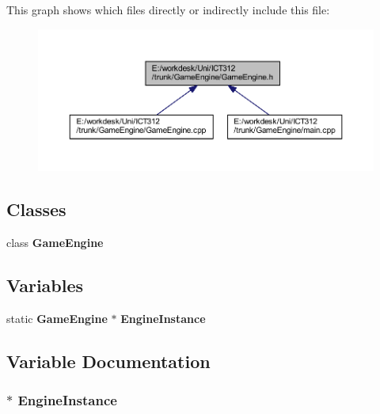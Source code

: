 This graph shows which files directly or indirectly include this file\+:\nopagebreak
\begin{figure}[H]
\begin{center}
\leavevmode
\includegraphics[width=350pt]{d8/dad/_game_engine_8h__dep__incl}
\end{center}
\end{figure}
\subsection*{Classes}
\begin{DoxyCompactItemize}
\item 
class {\bf Game\+Engine}
\end{DoxyCompactItemize}
\subsection*{Variables}
\begin{DoxyCompactItemize}
\item 
static {\bf Game\+Engine} $\ast$ {\bf Engine\+Instance}
\end{DoxyCompactItemize}


\subsection{Variable Documentation}
\subsubsection[{Engine\+Instance}]{$\ast$ Engine\+Instance\hspace{0.3cm}{\ttfamily [static]}}\label{_game_engine_8h_ac7f7aceaecb3a3313b6adfc289a26c33}
